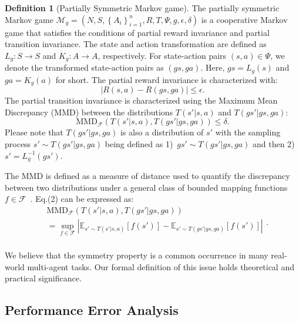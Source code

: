 \documentclass[letterpaper]{article} %
\theoremstyle{definition}
\newtheorem{definition}{Definition}
\begin{document}
\begin{definition}[Partially Symmetric Markov game]
The partially symmetric Markov game $\mathcal{M}_g=(N, S,  \left\{A_{i}\right\}_{i=1}^{n}, R, T, \Psi, g, \epsilon,  \delta )$ is a cooperative Markov game that satisfies the conditions of partial reward invariance and partial transition invariance. The state and action transformation are defined as $L_{g}: S \rightarrow S$ and $K_{g}: A \rightarrow A$, respectively. For state-action pairs $(s,a) \in \Psi$, we denote the transformed state-action pairs as $(gs,ga)$. Here, $
gs=L_{g}(s)$ and $ga=K_{g}(a)$ for short. The partial reward invariance is characterized with:
\begin{equation}
    |R(s, a) - R(gs, ga)| \leq \epsilon \label{rewardequ}.
\end{equation}
The partial transition invariance is characterized using the Maximum Mean Discrepancy (MMD) between the distributions $T(s'|s, a)$ and $T(gs'|gs, ga)$: 
\begin{equation}
    \text{MMD}_{\mathcal{F}}\left(T(s'|s, a), T(gs'|gs, ga)\right)\leq \delta \label{transequ}.
\end{equation}
Please note that $T(gs'|gs, ga)$ is also a distribution of $s'$ with the sampling process $s' \sim T(gs'|gs, ga)$ being defined as 1)~$gs' \sim T(gs'|gs, ga)$ and then 2) $s'=L_g^{-1}(gs')$.

The MMD is defined as a measure of distance used to quantify the discrepancy between two distributions under a general class of bounded mapping functions $f \in \mathcal{F}$~\cite{MMD}. Eq.(2) can be expressed as:
\begin{equation*}
\begin{aligned}
    &\text{MMD}_{\mathcal{F}}\left(T(s'|s, a), T(gs'|gs, ga)\right) \\
    &= \sup_{f \in \mathcal{F}} \left| \mathbb{E}_{s' \sim T(s'|s, a)}[f(s')] - \mathbb{E}_{s' \sim T(gs'|gs, ga)}[f(s')] \right| \\   
\end{aligned}.
\end{equation*}
\end{definition}
We believe that the symmetry property is a common occurrence in many real-world multi-agent tasks. Our formal definition of this issue holds theoretical and practical significance.


\subsection{Performance Error Analysis}
\end{document}
